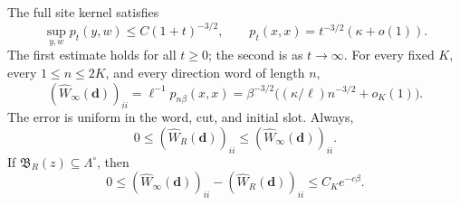 \begin{lemma}\label{lem:ideal-kernel}
The full site kernel satisfies
\begin{equation}\label{eq:ideal-site-bounds}
 \sup_{y,w}p_t(y,w)\le C(1+t)^{-3/2},\qquad
 p_t(x,x)=t^{-3/2}(\kappa+o(1)).
\end{equation}
The first estimate holds for all \(t\ge0\); the second is as
\(t\to\infty\). For every fixed \(K\), every \(1\le n\le2K\), and every direction
word of length \(n\),
\begin{equation}\label{eq:ideal-diagonal}
 (\widehat W_\infty(\mathbf d))_{ii}
 =\ell^{-1}p_{n\beta}(x,x)
 =\beta^{-3/2}\bigl((\kappa/\ell)n^{-3/2}+o_K(1)\bigr).
\end{equation}
The error is uniform in the word, cut, and initial slot. Always,
\begin{equation}\label{eq:ideal-killed-upper}
 0\le(\widehat W_R(\mathbf d))_{ii}
 \le(\widehat W_\infty(\mathbf d))_{ii}.
\end{equation}
If \(\mathfrak B_R(z)\subseteq\Lambda^\circ\), then
\begin{equation}\label{eq:ideal-killed-interior}
 0\le(\widehat W_\infty(\mathbf d))_{ii}
          -(\widehat W_R(\mathbf d))_{ii}
 \le C_K e^{-c\beta}.
\end{equation}
\end{lemma}

